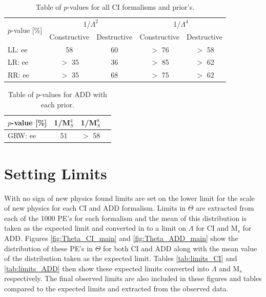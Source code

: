     \begin {table}[h]
        \begin{center}
        \begin{tabular}{ | l | c | c | c | c | } 
            \hline
            \multirow{2}{*}{$p$-value [\%]} & \multicolumn{2}{c|}{1/$\Lambda^2$} & \multicolumn{2}{c}{1/$\Lambda^4$} \\
            \cline{2-5}
            & Constructive & Destructive & Constructive & Destructive \\
            \hline
            LL: ee & 58 & 60 & $>$ 76 & $>$ 58 \\
            LR: ee & $>$ 35 & 36 & $>$ 85 & $>$ 62 \\
            RR: ee & $>$ 35 & 68 & $>$ 75 & $>$ 62 \\
            \hline
        \end{tabular}
        \caption{Table of $p$-values for all CI formalisms and prior's.}
        \label{tab:pvalue_CI}
        \end{center}
    \end {table}


    \begin {table}[h]
        \begin{center}
        \begin{tabular}{ | l | c | c | c | } 
            \hline
            $p$-value [\%] & 1/M$_S^4$ & 1/M$_S^8$ \\
            \hline
            GRW: ee & 51 & $>$ 58 \\
            \hline
        \end{tabular}
        \caption{Table of $p$-values for ADD with each prior.}
        \label{tab:pvalue_ADD}
        \end{center}
    \end {table}






\section{Setting Limits}
    
    With no sign of new physics found limits are set on the lower limit for the scale of new physics for each CI and ADD formalism. Limits in $\Theta$ are extracted from each of the 1000 PE's for each formalism and the mean of this distribution is taken as the expected limit and converted in to a limit on $\Lambda$ for CI and M$_{s}$ for ADD. Figures \ref{fig:Theta_CI_main} and \ref{fig:Theta_ADD_main} show the distribution of these PE's in $\Theta$ for both CI and ADD along with the mean value of the distribution taken as the expected limit. Tables \ref{tab:limits_CI} and \ref{tab:limits_ADD} then show these expected limits converted into $\Lambda$ and M$_{s}$ respectively. The final observed limits are also included in these figures and tables compared to the expected limits and extracted from the observed data. 


